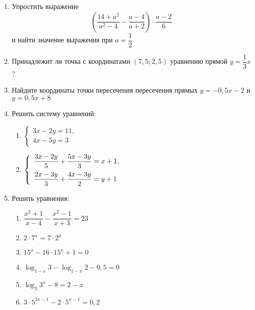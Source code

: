 \documentclass[12pt, a4paper]{article}
\begin{document}
	  
	\begin{enumerate}[label=\textbf{\arabic*.}]
		\item Упростить выражение $$\left(\dfrac{14+a^2}{a^2-4}-\dfrac{a-4}{a+2}\right)\cdot\dfrac{a-2}{6}$$ и найти значение выражения при $a=\dfrac{1}{2}$.
		\item Принадлежит ли точка с координатами $(7,5;2,5)$ уравнению прямой $y=\dfrac{1}{3}x$?
		\item Найдите координаты точки пересечения пересечения прямых $y=-0,5x-2$ и $y=0,5x+8$
		\item Решить систему уравнений:
		\begin{multicols}{2}
			\begin{enumerate}[label=\asbuk*)]
				\item $\left\{
				\begin{array}{l}
					3x-2y=11,\\
					4x-5y=3
				\end{array}
				\right.$
				\item $\left\{
				\begin{array}{l}
					\dfrac{3x-2y}{5}+\dfrac{5x-3y}{3}=x+1,\vspace{0,2cm}\\
					\dfrac{2x-3y}{3}+\dfrac{4x-3y}{2}=y+1
				\end{array}
				\right.$
			\end{enumerate}
		\end{multicols}
		\item Решить уравнения:
		\begin{multicols}{2}
			\begin{enumerate}[label=\asbuk*)]
				\item \( \dfrac{x^2+1}{x-4}-\dfrac{x^2-1}{x+3}=23 \)
				\item \( 2\cdot7^x=7\cdot2^x \)
				\item \( 15^x-16\cdot15^x+1=0 \)
				\item \( \log_{1-x} 3 - \log_{1-x} 2 - 0,5=0 \)
				\item \( \log_3{3^x-8}=2-x \)
				\item \( 3\cdot5^{2x-1}-2\cdot5^{x-1}=0,2 \)
			\end{enumerate}
		\end{multicols}
	\end{enumerate}
\end{document}
